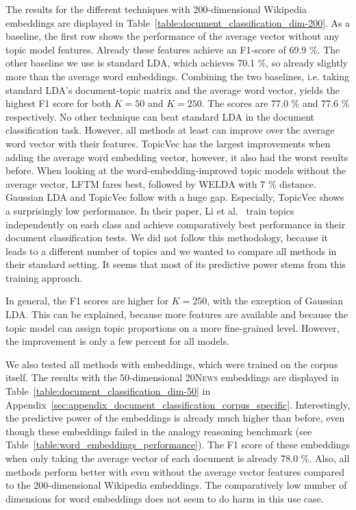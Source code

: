 \documentclass[
        a4paper,
        titlepage,
        twoside,
        parskip
        ]{scrbook}
\theoremstyle{break}
\begin{document}
The results for the different techniques with 200-dimensional Wikipedia embeddings are displayed in Table~\ref{table:document_classification_dim-200}.
As a baseline, the first row shows the performance of the average vector without any topic model features.
Already these features achieve an F1-score of 69.9 \%.
The other baseline we use is standard LDA, which achieves 70.1 \%, so already slightly more than the average word embeddings.
Combining the two baselines, i.e. taking standard LDA's document-topic matrix and the average word vector, yields the highest F1 score for both $K = 50$ and $K = 250$.
The scores are 77.0 \% and 77.6 \% respectively.
No other technique can beat standard LDA in the document classification task.
However, all methods at least can improve over the average word vector with their features.
TopicVec has the largest improvements when adding the average word embedding vector, however, it also had the worst results before.
When looking at the word-embedding-improved topic models without the average vector, LFTM fares best, followed by WELDA with 7 \% distance.
Gaussian LDA and TopicVec follow with a huge gap.
Especially, TopicVec shows a surprisingly low performance.
In their paper,  Li et al.~\cite{Li2016} train topics independently on each class and achieve comparatively best performance in their document classification tests.
We did not follow this methodology, because it leads to a different number of topics and we wanted to compare all methods in their standard setting.
It seems that most of its predictive power stems from this training approach.

In general, the F1 scores are higher for $K = 250$, with the exception of Gaussian LDA.
This can be explained, because more features are available and because the topic model can assign topic proportions on a more fine-grained level.
However, the improvement is only a few percent for all models.

We also tested all methods with embeddings, which were trained on the corpus itself.
The results with the 50-dimensional \textsc{20News} embeddings are displayed in Table~\ref{table:document_classification_dim-50} in Appendix~\ref{sec:appendix_document_classification_corpus_specific}.
Interestingly, the predictive power of the embeddings is already much higher than before, even though these embeddings failed in the analogy reasoning benchmark (see Table~\ref{table:word_embeddings_performance}).
The F1 score of these embeddings when only taking the average vector of each document is already 78.0 \%.
Also, all methods perform better with even without the average vector features compared to the 200-dimensional Wikipedia embeddings.
The comparatively low number of dimensions for word embeddings does not seem to do harm in this use case.
\end{document}

